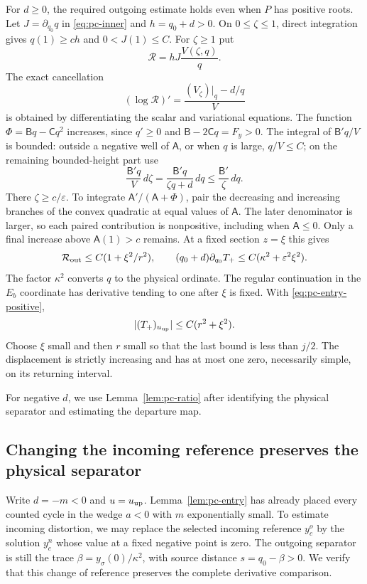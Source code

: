 For $d\ge0$, the required outgoing estimate holds even when $P$ has
positive roots. Let $J=\partial_{q_0}q$ in \eqref{eq:pc-inner} and
$h=q_0+d>0$. On $0\le\zeta\le1$, direct integration gives
$q(1)\ge ch$ and $0<J(1)\le C$. For $\zeta\ge1$ put
\[
 \mathcal R=hJ\frac{V(\zeta,q)}q.
\]
The exact cancellation
\begin{equation}
\label{eq:pc-positive-cancellation}
 (\log\mathcal R)'=\frac{(V_\zeta)|_q-d/q}{V}
\end{equation}
is obtained by differentiating the scalar and variational equations.
The function $\Phi=\mathsf Bq-\mathsf Cq^2$ increases, since
$q'\ge0$ and $\mathsf B-2\mathsf Cq=F_y>0$. The integral of
$\mathsf B'q/V$ is bounded: outside a negative well of $\mathsf A$,
or when $q$ is large, $q/V\le C$; on the remaining bounded-height
part use
\[
 \frac{\mathsf B'q}{V}\,d\zeta
 =\frac{\mathsf B'q}{\zeta q+d}\,dq
 \le\frac{\mathsf B'}\zeta\,dq.
\]
There $\zeta\ge c/\varepsilon$. To integrate
$\mathsf A'/(\mathsf A+\Phi)$, pair the decreasing and increasing
branches of the convex quadratic at equal values of $\mathsf A$.
The later denominator is larger, so each paired contribution is
nonpositive, including when $\mathsf A\le0$. Only a final increase
above $\mathsf A(1)>c$ remains. At a fixed section $z=\xi$ this gives
\[
 \mathcal R_{\rm out}\le C(1+\xi^2/r^2),\qquad
 (q_0+d)\partial_{q_0}T_+
          \le C(\kappa^2+\varepsilon^2\xi^2).
\]
The factor $\kappa^2$ converts $q$ to the physical ordinate. The
regular continuation in the $E_b$ coordinate has derivative tending
to one after $\xi$ is fixed. With \eqref{eq:pc-entry-positive},
\[
 |(T_+)_{u_{\rm up}}|\le C(r^2+\xi^2).
\]
Choose $\xi$ small and then $r$ small so that the last bound is less
than $j/2$. The displacement is strictly increasing and has at most one
zero, necessarily simple, on its returning interval.

For negative $d$, we use Lemma~\ref{lem:pc-ratio} after identifying
the physical separator and estimating the departure map.

\subsection{Changing the incoming reference preserves the physical separator}
Write $d=-m<0$ and $u=u_{\rm up}$. Lemma~\ref{lem:pc-entry}
has already placed every counted cycle in the wedge $a<0$ with $m$
exponentially small. To estimate incoming distortion, we may replace
the selected incoming reference $y_c^o$ by the solution $y_c^n$ whose
value at a fixed negative point is zero. The outgoing separator is
still the trace $\beta=y_\sigma(0)/\kappa^2$, with source distance
$s=q_0-\beta>0$. We verify that this change of reference preserves
the complete derivative comparison.

